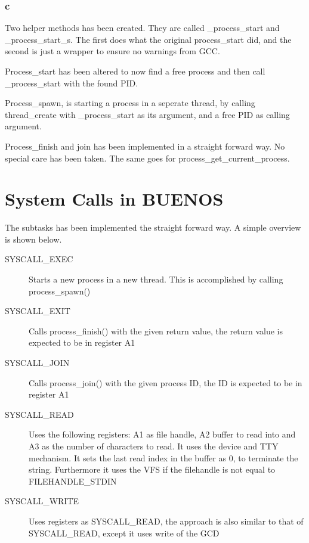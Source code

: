 \documentclass[10pt]{article}
\begin{document}
\subsubsection*{c}
Two helper methods has been created. They are called \_process\_start and
\_process\_start\_s. The first does what the original process\_start did, and
the second is just a wrapper to ensure no warnings from GCC.

Process\_start has been altered to now find a free process and then call
\_process\_start with the found PID.

Process\_spawn, is starting a process in a seperate thread, by calling
thread\_create with \_process\_start as its argument, and a free PID as
calling argument.

Process\_finish and join has been implemented in a straight forward way. No
special care has been taken. The same goes for process\_get\_current\_process.

\section{System Calls in BUENOS}
The subtasks has been implemented the straight forward way.
A simple overview is shown below.

\begin{description}
\item[SYSCALL\_EXEC] Starts a new process in a new thread. This is accomplished
by calling process\_spawn()
\item[SYSCALL\_EXIT] Calls process\_finish() with the given return value, the
return value is expected to be in register A1
\item[SYSCALL\_JOIN] Calls process\_join() with the given process ID, the ID is
expected to be in register A1
\item[SYSCALL\_READ] Uses the following registers: A1 as file handle, A2 buffer
to read into and A3 as the number of characters to read. It uses the device and
TTY mechanism. It sets the last read index in the buffer as 0, to terminate the
string. Furthermore it uses the VFS if the filehandle is not equal to
FILEHANDLE\_STDIN
\item[SYSCALL\_WRITE] Uses registers as SYSCALL\_READ, the approach is also 
similar to that of SYSCALL\_READ, except it uses write of the GCD
\end{description}
\end{document}
